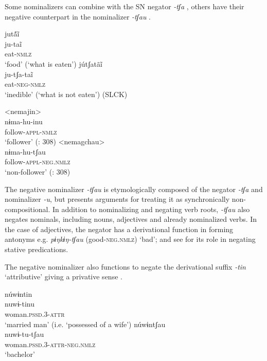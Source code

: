 \documentclass[output=paper,colorlinks,citecolor=brown,draft]{langscibook}
\begin{document}
Some nominalizers can combine with the SN negator \textit{{}-tʃa} , others have their negative counterpart in the nominalizer \textit{{}-tʃau} .

\ea\label{ex:agu:52}
    \ea\label{ex:agu:52a}
        \glll jutã́ĩ \\
              ju-taĩ \\ 
              eat-\textsc{nmlz} \\
        \glt ‘food’ (‘what is eaten’) \citep[66]{Overall2017a}
    \ex\label{ex:agu:52b}
       \glll jútʃatãĩ \\
             ju-tʃa-taĩ \\
             eat-\textsc{neg-nmlz} \\
        \glt ‘inedible’ (‘what is not eaten’) (SLCK)
    \z
\z 

\ea\label{ex:agu:53}
    \ea\label{ex:agu:53a}
        \glll <nemajin> \\ 
              nɨma-hu-inu \\
              follow-\textsc{appl-nmlz} \\
        \glt ‘follower’ (\citealt{LigaBíblica2008}: 308)
    \ex\label{ex:agu:53b}
        \glll <nemagchau> \\
              nɨma-hu-tʃau \\
              follow-\textsc{appl-neg.nmlz} \\
        \glt ‘non-follower’ (\citealt{LigaBíblica2008}: 308)
    \z
\z 

The negative nominalizer \textit{{}-tʃau} is etymologically composed of the negator \textit{\nobreakdash-tʃa} and nominalizer \textit{{}-u}, but \citet[513--514]{Overall2017a} presents arguments for treating it as synchronically non-compositional. In addition to nominalizing and negating verb roots, \textit{{}-tʃau} also negates nominals, including nouns, adjectives and already nominalized verbs. In the case of adjectives, the negator has a derivational function in forming antonyms e.g. \textit{pɨŋkɨŋ-tʃau} (good-\textsc{neg.nmlz}) ‘bad’; and see  for its role in negating stative predications.

The negative nominalizer also functions to negate the derivational suffix \textit{{}-tin} ‘attributive’  giving a privative sense .

\ea\label{ex:agu:54}
    \ea\label{ex:agu:54a}
        \glll núwɨntin \\ 
              nuwɨ-tinu \\
              woman.\textsc{pssd.3-attr} \\
        \glt ‘married man’ (i.e. ‘possessed of a wife’) \citep[88]{UwaraiYagkugRegan1998}
    \ex\label{ex:agu:54b}
        \glll núwɨntʃau \\
              nuwɨ\nobreakdash-tu\nobreakdash-tʃau \\
              woman.\textsc{pssd.3-attr-neg.nmlz} \\
        \glt ‘bachelor’ \citep[88]{UwaraiYagkugRegan1998}
    \z
\z 
\end{document}
